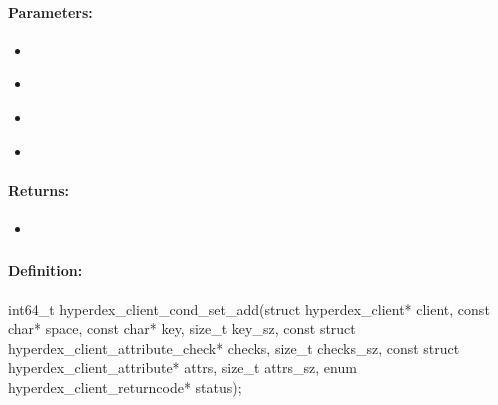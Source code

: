 \paragraph{Parameters:}
\begin{itemize}[noitemsep]
\item {}\\

\item {}\\

\item {}\\

\item {}\\

\end{itemize}

\paragraph{Returns:}
\begin{itemize}[noitemsep]
\item {}\\

\end{itemize}

\pagebreak
\subsubsection{}
\label{api:c:cond_set_add}


\paragraph{Definition:}
\begin{ccode}
int64_t hyperdex_client_cond_set_add(struct hyperdex_client* client,
        const char* space,
        const char* key, size_t key_sz,
        const struct hyperdex_client_attribute_check* checks, size_t checks_sz,
        const struct hyperdex_client_attribute* attrs, size_t attrs_sz,
        enum hyperdex_client_returncode* status);
\end{ccode}

